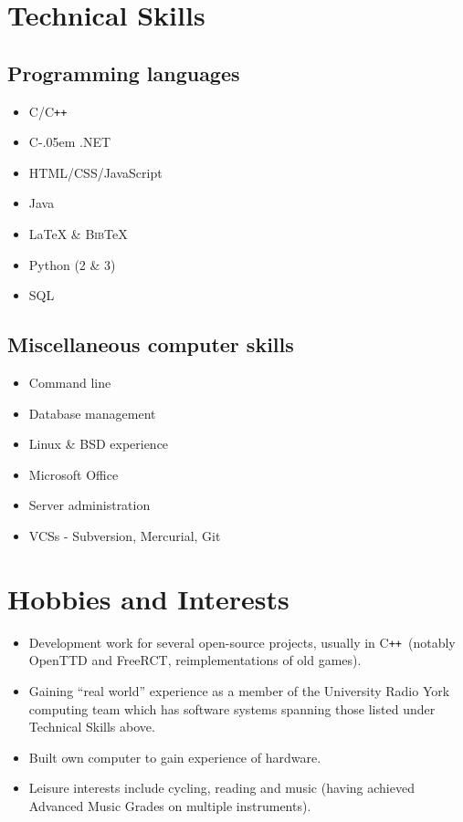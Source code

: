 \documentclass[11pt,a4paper]{article}
\newcommand{\cpp}{C{}\texttt{++}}
\newcommand{\cs}{\settoheight{\dimen0}{C}C\kern-.05em \resizebox{!}{\dimen0}{\raisebox{\depth}{\textbf{\#}}}}
\begin{document}
\section*{Technical Skills}
\begin{minipage}[t]{.45\textwidth}
\subsection*{Programming languages}
\begin{itemize}
  \item C/\cpp
  \item \cs.NET
  \item HTML/CSS/JavaScript
  \item Java
  \item \LaTeX{} \& \textsc{Bib}\TeX
  \item Python (2 \& 3)
  \item SQL
\end{itemize}
\end{minipage}
\hspace{0.5cm}
\begin{minipage}[t]{.45\textwidth}
\subsection*{Miscellaneous computer skills}
\begin{itemize}
  \item Command line
  \item Database management
  \item Linux \& BSD experience
  \item Microsoft Office
  \item Server administration
  \item VCSs - Subversion, Mercurial, Git
\end{itemize}
\end{minipage}

\section*{Hobbies and Interests}
\begin{itemize}  \itemsep1pt \parskip0pt 
  \item Development work for several open-source projects, usually in \cpp ~(notably OpenTTD and FreeRCT, reimplementations of old games).
  \item Gaining ``real world'' experience as a member of the University Radio York computing team which has software systems spanning those listed under Technical Skills above.
  \item Built own computer to gain experience of hardware.
  \item Leisure interests include cycling, reading and music (having achieved Advanced Music Grades on multiple instruments).
\end{itemize}
\end{document}

